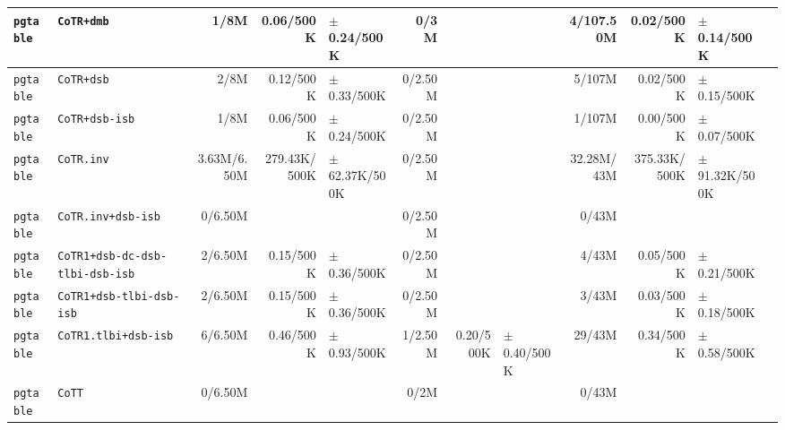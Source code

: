 \begin{tabular}{l l  | r r l | r r l | r r l l}
        \verb|pgtable| &                                             \verb|CoTR+dmb| &           1/8M &             0.06/500K &   $\pm$ 0.24/500K &           0/3M &                       &                   &      4/107.50M &             0.02/500K &    $\pm$ 0.14/500K & \\ \hline 
        \verb|pgtable| &                                             \verb|CoTR+dsb| &           2/8M &             0.12/500K &   $\pm$ 0.33/500K &        0/2.50M &                       &                   &         5/107M &             0.02/500K &    $\pm$ 0.15/500K & \\ \hline 
        \verb|pgtable| &                                         \verb|CoTR+dsb-isb| &           1/8M &             0.06/500K &   $\pm$ 0.24/500K &        0/2.50M &                       &                   &         1/107M &             0.00/500K &    $\pm$ 0.07/500K & \\ \hline 
        \verb|pgtable| &                                             \verb|CoTR.inv| &    3.63M/6.50M &          279.43K/500K & $\pm$ 62.37K/500K &        0/2.50M &                       &                   &     32.28M/43M &          375.33K/500K &  $\pm$ 91.32K/500K & \\ \hline 
        \verb|pgtable| &                                     \verb|CoTR.inv+dsb-isb| &        0/6.50M &                       &                   &        0/2.50M &                       &                   &          0/43M &                       &                    & \\ \hline 
        \verb|pgtable| &                        \verb|CoTR1+dsb-dc-dsb-tlbi-dsb-isb| &        2/6.50M &             0.15/500K &   $\pm$ 0.36/500K &        0/2.50M &                       &                   &          4/43M &             0.05/500K &    $\pm$ 0.21/500K & \\ \hline 
        \verb|pgtable| &                               \verb|CoTR1+dsb-tlbi-dsb-isb| &        2/6.50M &             0.15/500K &   $\pm$ 0.36/500K &        0/2.50M &                       &                   &          3/43M &             0.03/500K &    $\pm$ 0.18/500K & \\ \hline 
        \verb|pgtable| &                                   \verb|CoTR1.tlbi+dsb-isb| &        6/6.50M &             0.46/500K &   $\pm$ 0.93/500K &        1/2.50M &             0.20/500K &   $\pm$ 0.40/500K &         29/43M &             0.34/500K &    $\pm$ 0.58/500K & \\ \hline 
        \verb|pgtable| &                                                 \verb|CoTT| &        0/6.50M &                       &                   &           0/2M &                       &                   &          0/43M &                       &                    & \\ \hline 

\end{tabular}
